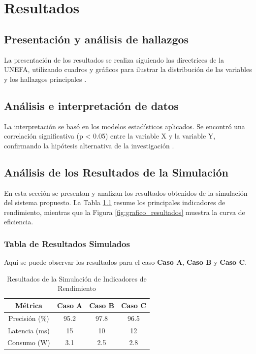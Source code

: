\chapter{Resultados}

\section{Presentación y análisis de hallazgos}
\lipsum[23]
La presentación de los resultados se realiza siguiendo las directrices de la UNEFA, utilizando cuadros y gráficos para ilustrar la distribución de las variables y los hallazgos principales \parencite{online:unefa2022}.

\section{Análisis e interpretación de datos}
\lipsum[24]
La interpretación se basó en los modelos estadísticos aplicados. Se encontró una correlación significativa (p < 0.05) entre la variable X y la variable Y, confirmando la hipótesis alternativa de la investigación \parencite{article:perez2020}.

\section{Análisis de los Resultados de la Simulación}

En esta sección se presentan y analizan los resultados obtenidos de la simulación del sistema propuesto. La Tabla \ref{tab:simulacion} resume los principales indicadores de rendimiento, mientras que la Figura \ref{fig:grafico_resultados} muestra la curva de eficiencia.

\subsection{Tabla de Resultados Simulados}

Aquí se puede observar los resultados para el caso \textbf{Caso A}, \textbf{Caso B} y \textbf{Caso C}.

\begin{table}[htbp]
    \centering
    \caption{Resultados de la Simulación de Indicadores de Rendimiento}
    \label{tab:simulacion}
    \begin{tabular}{|c|c|c|c|}
        \hline
        \textbf{Métrica} & \textbf{Caso A} & \textbf{Caso B} & \textbf{Caso C} \\
        \hline
        Precisión (\%) & 95.2 & 97.8 & 96.5 \\
        Latencia (ms) & 15 & 10 & 12 \\
        Consumo (W) & 3.1 & 2.5 & 2.8 \\
        \hline
    \end{tabular}
\end{table}

